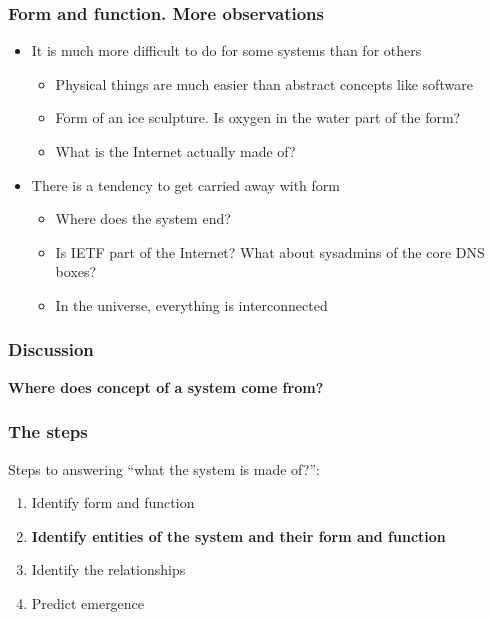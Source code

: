 \documentclass[10pt, compress]{beamer}
\begin{document}
\begin{frame}[fragile]
  \frametitle{Form and function. More observations}
  \begin{itemize}
  	\item It is much more difficult to do for some systems than for others
	\begin{itemize}
		\item Physical things are much easier than abstract concepts like software
		\item Form of an ice sculpture. Is oxygen in the water part of the form?
		\item What is the Internet actually made of?
	\end{itemize}
	\item There is a tendency to get carried away with form
	\begin{itemize}
		\item Where does the system end?
		\item Is IETF part of the Internet? What about sysadmins of the core DNS boxes?
		\item In the universe, everything is interconnected
	\end{itemize}
  \end{itemize}
	
\end{frame}

\begin{frame}[fragile]
  \frametitle{Discussion}
		\begin{center}
			\textbf{Where does concept of a system come from?}
		\end{center}
\end{frame}

\begin{frame}[fragile]
  \frametitle{The steps}
	Steps to answering \enquote{what the system is made of?}:
		\begin{enumerate}
			\item Identify form and function
			\item \textbf{Identify entities of the system and their form and function}
			\item Identify the relationships
			\item Predict emergence
		\end{enumerate}
		
\end{frame}
\end{document}

